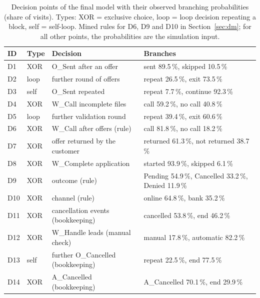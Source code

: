 \begin{table}[h]
  \caption{Decision points of the final model with their observed branching
  probabilities (share of visits). Types: XOR = exclusive choice, loop =
  loop decision repeating a block, self = self-loop. Mined rules for D6, D9
  and D10 in Section~\ref{sec:dm}; for all other points, the probabilities are
  the simulation input.}
  \centering\small
  \begin{tabular}{llll}
    \toprule
    \textbf{ID} & \textbf{Type} & \textbf{Decision} & \textbf{Branches} \\
    \midrule
    D1  & XOR  & O\_Sent after an offer           & sent 89.5\,\%, skipped 10.5\,\% \\
    D2  & loop & further round of offers          & repeat 26.5\,\%, exit 73.5\,\% \\
    D3  & self & O\_Sent repeated                 & repeat 7.7\,\%, continue 92.3\,\% \\
    D4  & XOR  & W\_Call incomplete files         & call 59.2\,\%, no call 40.8\,\% \\
    D5  & loop & further validation round         & repeat 39.4\,\%, exit 60.6\,\% \\
    D6  & XOR  & W\_Call after offers (rule)      & call 81.8\,\%, no call 18.2\,\% \\
    D7  & XOR  & offer returned by the customer   & returned 61.3\,\%, not returned 38.7\,\% \\
    D8  & XOR  & W\_Complete application          & started 93.9\,\%, skipped 6.1\,\% \\
    D9  & XOR  & outcome (rule)                   & Pending 54.9\,\%, Cancelled 33.2\,\%, Denied 11.9\,\% \\
    D10 & XOR  & channel (rule)                   & online 64.8\,\%, bank 35.2\,\% \\
    D11 & XOR  & cancellation events (bookkeeping) & cancelled 53.8\,\%, end 46.2\,\% \\
    D12 & XOR  & W\_Handle leads (manual check)   & manual 17.8\,\%, automatic 82.2\,\% \\
    D13 & self & further O\_Cancelled (bookkeeping) & repeat 22.5\,\%, end 77.5\,\% \\
    D14 & XOR  & A\_Cancelled (bookkeeping)       & A\_Cancelled 70.1\,\%, end 29.9\,\% \\
    \bottomrule
  \end{tabular}
  \label{tab:dpoints}
\end{table}

